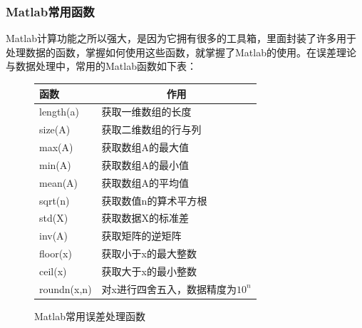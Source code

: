 \subsubsection{Matlab常用函数}
Matlab计算功能之所以强大，是因为它拥有很多的工具箱，里面封装了许多用于处理数据的函数，掌握如何使用这些函数，就掌握了Matlab的使用。在误差理论与数据处理中，常用的Matlab函数如下表：
\begin{figure}[H]
	\centering
	\begin{tabular}{p{3cm}<{\centering}p{8cm}}
		\toprule
		\textbf{函数}&\multicolumn{1}{c}{\textbf{作用}}	\\
		\midrule
		length(a)	&获取一维数组的长度\\
		size(A)	&获取二维数组的行与列\\
		max(A)	&获取数组A的最大值\\
		min(A)	&获取数组A的最小值\\
		mean(A)	&获取数组A的平均值\\
		sqrt(n)	&获取数值n的算术平方根\\
		std(X)	&获取数据X的标准差\\
		inv(A)	&获取矩阵的逆矩阵\\
		floor(x)	&获取小于x的最大整数\\
		ceil(x)	&获取大于x的最小整数\\
		roundn(x,n)	&对x进行四舍五入，数据精度为$ 10^n $\\
		\bottomrule
	\end{tabular}
	\captionsetup{type=table}
	\caption{Matlab常用误差处理函数}
\end{figure}
